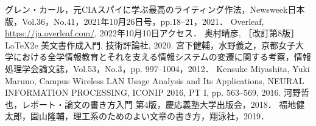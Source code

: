 \documentclass[a4paper,twocolumn,10pt]{ltjsarticle}
\begin{document}
\begin{thebibliography}{99}
  グレン・カール，元CIAスパイに学ぶ最高のライティング作法，Newsweek日本版，Vol.36，No.41，2021年10月26日号，pp.18--21，2021．
  Overleaf, \url{https://ja.overleaf.com/}, 2022年10月10日アクセス．
  奥村晴彦, ［改訂第8版］\LaTeX2e 美文書作成入門, 技術評論社, 2020.
  宮下健輔，水野義之，京都女子大学における全学情報教育とそれを支える情報システムの変遷に関する考察，情報処理学会論文誌，Vol.53，No.3，pp. 997--1004，2012．
  Kensuke Miyashita, Yuki Maruno, Campus Wireless LAN Usage Analysis and Its Applications, NEURAL INFORMATION PROCESSING, ICONIP 2016, PT I, pp. 563--569, 2016.
  河野哲也，レポート・論文の書き方入門 第4版，慶応義塾大学出版会，2018．
  福地健太郎，園山隆輔，理工系のためのよい文章の書き方，翔泳社，2019．
\end{thebibliography}
\end{document}
